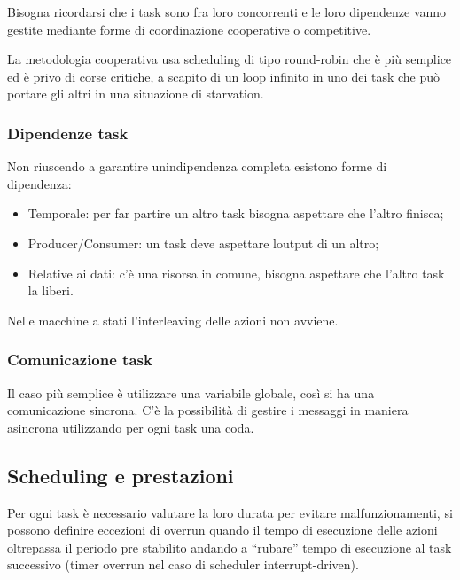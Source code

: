 \documentclass[
]{article}
\providecommand{\tightlist}{%
  \setlength{\itemsep}{0pt}\setlength{\parskip}{0pt}}
\begin{document}
{}

{Bisogna ricordarsi che i task sono fra loro concorrenti e le loro
dipendenze vanno gestite mediante forme di coordinazione cooperative o
competitive.}

{}

{La metodologia cooperativa usa scheduling di tipo round-robin che è più
semplice ed è privo di corse critiche, a scapito di un loop infinito in
uno dei task che può portare gli altri in una situazione di starvation.}

\subsubsection{\texorpdfstring{{Dipendenze
task}}{Dipendenze task}}\label{h.30liklh7gu2m}

{Non riuscendo a garantire un\textquotesingle indipendenza completa
esistono forme di dipendenza:}

\begin{itemize}
\tightlist
\item
  {Temporale: per far partire un altro task bisogna aspettare che
  l'altro finisca;}
\item
  {Producer/Consumer: un task deve aspettare l\textquotesingle output di
  un altro;}
\item
  {Relative ai dati: c'è una risorsa in comune, bisogna aspettare che
  l'altro task la liberi.}
\end{itemize}

{}

{Nelle macchine a stati l'interleaving delle azioni non avviene.}

\subsubsection{\texorpdfstring{{Comunicazione
task}}{Comunicazione task}}\label{h.dv7ctx9nnl2c}

{Il caso più semplice è utilizzare una variabile globale, così si ha una
comunicazione sincrona. C'è la possibilità di gestire i messaggi in
maniera asincrona utilizzando per ogni task una coda.}

{}

\subsection{\texorpdfstring{{Scheduling e
prestazioni}}{Scheduling e prestazioni}}\label{h.ncqlbrd22hng}

{Per ogni task è necessario valutare la loro durata per evitare
malfunzionamenti, si possono definire eccezioni di overrun quando il
tempo di esecuzione delle azioni oltrepassa il periodo pre stabilito
andando a ``rubare'' tempo di esecuzione al task successivo (timer
overrun nel caso di scheduler interrupt-driven).}
\end{document}
